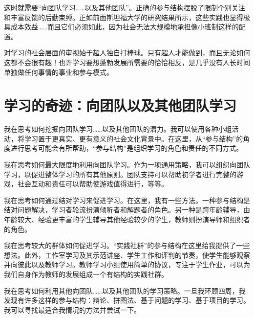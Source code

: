 这时就需要“向团队学习……以及其他团队”。正确的参与结构摆脱了限制个别关注和丰富反馈的后勤束缚。正如前面斯坦福大学的研究结果所示，这些实践也显得极具成本效益……而且它们必须如此，因为社会无法大规模地承担像小班制这样的配置。

对学习的社会层面的审视始于超人独自打棒球。只有超人才能做到，而且无论如何这都不会很有趣！也许学习要想蓬勃发展所需要的恰恰相反，是几乎没有人长时间单独做任何事情的事业和参与模式。

\section*{学习的奇迹：向团队以及其他团队学习}

我在思考如何挖掘向团队学习……以及其他团队的潜力。我可以使用各种小组活动，将学习置于更真实、更有意义的社会文化背景中。在这里，从“参与结构”的角度进行思考可能会有所帮助，“参与结构”是组织学习的角色和责任的不同方式。

我在思考如何最大限度地利用向团队学习。作为一项通用策略，我可以组织向团队学习，以促进整体学习的所有其他原则。团队支持可以帮助初学者进行完整的游戏，社会互动和责任可以帮助使游戏值得进行，等等。

我在思考如何通过结对学习来促进学习。在这里，我有一些方法。一种参与结构是结对问题解决，学习者轮流扮演倾听者和解题者的角色。另一种是跨年龄辅导，由年龄较大、经验更丰富的学生辅导其他经验较少的学生，教师则扮演导师和组织者的角色。

我在思考较大的群体如何促进学习。“实践社群”的参与结构在这里给我提供了一些想法。此外，工作室学习及其示范讲座、学生工作和评判的节奏，使学生能够观察并向彼此以及教师学习。教师学习小组使用简单的协议，专注于学生作业，可以为我们自身作为教师的发展组成一个有结构的实践社群。

我在思考如何利用其他向团队……以及其他团队的学习策略。一旦我环顾四周，我发现有许多这样的参与结构：辩论、拼图法、基于问题的学习、基于项目的学习。我可以寻找最适合我情况的方法并尝试一下。
 
